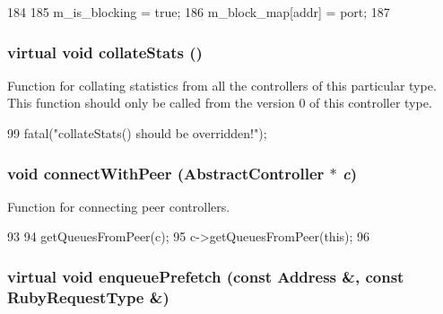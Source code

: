 \begin{DoxyCode}
184 {
185     m_is_blocking = true;
186     m_block_map[addr] = port;
187 }
\end{DoxyCode}
\hypertarget{classAbstractController_ae3089fd60541650eefd9605c2c1abc68}{
\subsubsection[{collateStats}]{\setlength{\rightskip}{0pt plus 5cm}virtual void collateStats ()}}
\label{classAbstractController_ae3089fd60541650eefd9605c2c1abc68}
Function for collating statistics from all the controllers of this particular type. This function should only be called from the version 0 of this controller type. 


\begin{DoxyCode}
99     {fatal("collateStats() should be overridden!");}
\end{DoxyCode}
\hypertarget{classAbstractController_a8d382287e22ac84bc108ad9ea6621603}{
\subsubsection[{connectWithPeer}]{\setlength{\rightskip}{0pt plus 5cm}void connectWithPeer ({\bf AbstractController} $\ast$ {\em c})}}
\label{classAbstractController_a8d382287e22ac84bc108ad9ea6621603}


Function for connecting peer controllers. 


\begin{DoxyCode}
93 {
94     getQueuesFromPeer(c);
95     c->getQueuesFromPeer(this);
96 }
\end{DoxyCode}
\hypertarget{classAbstractController_a4498badc3fa7137b6d66736d302623ae}{
\subsubsection[{enqueuePrefetch}]{\setlength{\rightskip}{0pt plus 5cm}virtual void enqueuePrefetch (const {\bf Address} \&, \/  const RubyRequestType \&)}}
\label{classAbstractController_a4498badc3fa7137b6d66736d302623ae}



